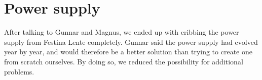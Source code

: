 \section {Power supply}

After talking to Gunnar and Magnus, we ended up with cribbing the power supply
from Festina Lente completely. Gunnar said the power supply had evolved year by
year, and would therefore be a better solution than trying to create one from
scratch ourselves. By doing so, we reduced the possibility for additional
problems.
